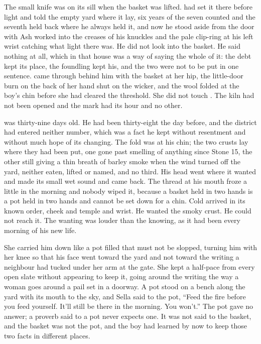 
The small knife was on its sill when the basket was lifted.  had set it there before light and told the empty yard where it lay, six years of the seven counted and the seventh held back where he always held it, and now he stood aside from the door with Ash worked into the creases of his knuckles and the pale clip-ring at his left wrist catching what light there was. He did not look into the basket. He said nothing at all, which in that house was a way of saying the whole of it: the debt kept its place, the foundling kept his, and the two were not to be put in one sentence.  came through behind him with the basket at her hip, the little-door burn on the back of her hand shut on the wicker, and the wool folded at the boy's chin before she had cleared the threshold. She did not touch . The kiln had not been opened and the mark had its hour and no other.

 was thirty-nine days old. He had been thirty-eight the day before, and the district had entered neither number, which was a fact he kept without resentment and without much hope of its changing. The fold was at his chin; the two crusts lay where they had been put, one gone past smelling of anything since Stone 15, the other still giving a thin breath of barley smoke when the wind turned off the yard, neither eaten, lifted or named, and no third. His head went where it wanted and made its small wet sound and came back. The thread at his mouth froze a little in the morning and nobody wiped it, because a basket held in two hands is a pot held in two hands and cannot be set down for a chin. Cold arrived in its known order, cheek and temple and wrist. He wanted the smoky crust. He could not reach it. The wanting was louder than the knowing, as it had been every morning of his new life.

She carried him down  like a pot filled that must not be slopped, turning him with her knee so that his face went toward the yard and not toward the writing a neighbour had tucked under her arm at the gate. She kept a half-pace from every open slate without appearing to keep it, going around the writing the way a woman goes around a pail set in a doorway. A pot stood on a bench along the yard with its mouth to the sky, and Sella said to the pot, “Feed the fire before you feed yourself. It'll still be there in the morning. You won't.” The pot gave no answer; a proverb said to a pot never expects one. It was not said to the basket, and the basket was not the pot, and the boy had learned by now to keep those two facts in different places.

